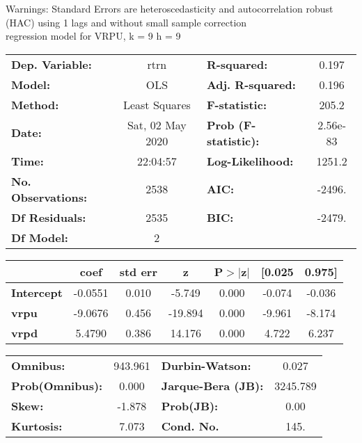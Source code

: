 Warnings: \newline
 [1] Standard Errors are heteroscedasticity and autocorrelation robust (HAC) using 1 lags and without small sample correction\\ 

regression model for VRPU, k = 9 h = 9\begin{center}
\begin{tabular}{lclc}
\toprule
\textbf{Dep. Variable:}    &       rtrn       & \textbf{  R-squared:         } &     0.197   \\
\textbf{Model:}            &       OLS        & \textbf{  Adj. R-squared:    } &     0.196   \\
\textbf{Method:}           &  Least Squares   & \textbf{  F-statistic:       } &     205.2   \\
\textbf{Date:}             & Sat, 02 May 2020 & \textbf{  Prob (F-statistic):} &  2.56e-83   \\
\textbf{Time:}             &     22:04:57     & \textbf{  Log-Likelihood:    } &    1251.2   \\
\textbf{No. Observations:} &        2538      & \textbf{  AIC:               } &    -2496.   \\
\textbf{Df Residuals:}     &        2535      & \textbf{  BIC:               } &    -2479.   \\
\textbf{Df Model:}         &           2      & \textbf{                     } &             \\
\bottomrule
\end{tabular}
\begin{tabular}{lcccccc}
                   & \textbf{coef} & \textbf{std err} & \textbf{z} & \textbf{P$> |$z$|$} & \textbf{[0.025} & \textbf{0.975]}  \\
\midrule
\textbf{Intercept} &      -0.0551  &        0.010     &    -5.749  &         0.000        &       -0.074    &       -0.036     \\
\textbf{vrpu}      &      -9.0676  &        0.456     &   -19.894  &         0.000        &       -9.961    &       -8.174     \\
\textbf{vrpd}      &       5.4790  &        0.386     &    14.176  &         0.000        &        4.722    &        6.237     \\
\bottomrule
\end{tabular}
\begin{tabular}{lclc}
\textbf{Omnibus:}       & 943.961 & \textbf{  Durbin-Watson:     } &    0.027  \\
\textbf{Prob(Omnibus):} &   0.000 & \textbf{  Jarque-Bera (JB):  } & 3245.789  \\
\textbf{Skew:}          &  -1.878 & \textbf{  Prob(JB):          } &     0.00  \\
\textbf{Kurtosis:}      &   7.073 & \textbf{  Cond. No.          } &     145.  \\
\bottomrule
\end{tabular}
\end{center}

